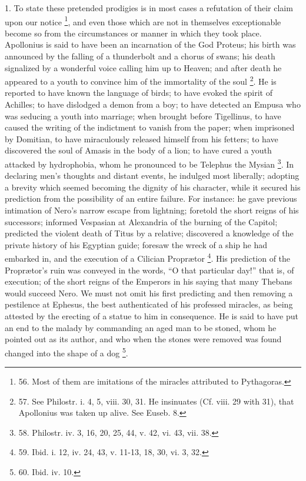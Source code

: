 1. To state these pretended
prodigies is in most cases a refutation of their claim upon our notice
\footnote{56.
Most of them are imitations of the miracles attributed to Pythagoras.}, and even those which
are not in themselves exceptionable become so from the circumstances
or manner in which they took place. Apollonius is said to have been an
incarnation of the God Proteus; his birth was announced by the falling
of a thunderbolt and a chorus of swans; his death signalized by a
wonderful voice calling him up to Heaven; and after death he appeared
to a youth to convince him of the immortality of the soul \footnote{57.
See Philostr. i. 4, 5, viii. 30, 31. He insinuates (Cf. viii. 29 with
31), that Apollonius was taken up alive. See Euseb. 8.}. He is reported to have known the language of birds; to have
evoked the spirit of Achilles; to have dislodged a demon from a boy;
to have detected an Empusa who was seducing a youth into marriage;
when brought before Tigellinus, to have caused the writing of the
indictment to vanish from the paper; when imprisoned by Domitian, to
have miraculously released himself from his fetters; to have
discovered the soul of Amasis in the body of a lion; to have cured a
youth attacked by hydrophobia, whom he pronounced to be Telephus
the Mysian \footnote{58.
Philostr. iv. 3, 16, 20, 25, 44, v. 42, vi. 43, vii. 38.}. In
declaring men's thoughts and distant events, he indulged most
liberally; adopting a brevity which seemed becoming the dignity of his
character, while it secured his prediction from the possibility of an
entire failure. For instance: he gave previous intimation of Nero's
narrow escape from lightning; foretold the short reigns of his
successors; informed Vespasian at Alexandria of the burning of the
Capitol; predicted the violent death of Titus by a relative;
discovered a knowledge of the private history of his Egyptian guide;
foresaw the wreck of a ship he had embarked in, and the execution of a
Cilician Proprætor \footnote{59.
Ibid. i. 12, iv. 24, 43, v. 11-13, 18, 30, vi. 3, 32.}.
His prediction of the Proprætor's ruin was conveyed in the words, ``O
that particular day!'' that is, of execution; of the short reigns of
the Emperors in his saying that many Thebans would succeed Nero. We
must not omit his first predicting and then removing a pestilence at
Ephesus, the best authenticated of his professed miracles, as being
attested by the erecting of a statue to him in consequence. He is said
to have put an end to the malady by commanding an aged man to be
stoned, whom he pointed out as its author, and who when the stones
were removed was found changed into the shape of a dog \footnote{60.
Ibid. iv. 10.}.

